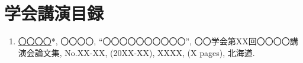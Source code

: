 \chapter*{学会講演目録}

\begin{enumerate}
\renewcommand{\labelenumi}{(\arabic{enumi})}
\item
\underline{〇〇〇〇}*, 〇〇〇〇, ``〇〇〇〇〇〇〇〇〇〇'', 〇〇学会第XX回〇〇〇〇講演会論文集, No.XX-XX, (20XX-XX), XXXX, (X pages), 北海道. 
\end{enumerate}

